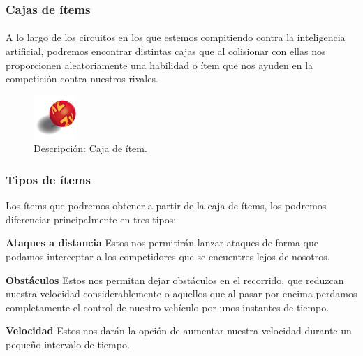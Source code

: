\subsubsection{Cajas de ítems} 

\paragraph{}
A lo largo de los circuitos en los que estemos compitiendo contra la inteligencia artificial, 
podremos encontrar distintas cajas que al colisionar con ellas nos proporcionen
aleatoriamente una habilidad o ítem que nos
ayuden en la competición contra nuestros rivales.

\begin{figure}[H]
	\label{item_box}
	\begin{center}
		\includegraphics[scale=1]{imagenes/items/item_box.png}
	\end{center}
	\caption{Descripción: Caja de ítem.}
\end{figure}

\subsubsection{Tipos de ítems}

Los ítems que podremos obtener a partir de la caja de ítems, los podremos diferenciar principalmente en tres tipos:

\begin{description}
	\item \textbf{Ataques a distancia} Estos nos permitirán lanzar ataques
        de forma que podamos interceptar a los competidores que 
	se encuentres lejos de nosotros.
	
	\item \textbf{Obstáculos} Estos nos permitan dejar obstáculos en el
        recorrido, que reduzcan nuestra velocidad considerablemente
	o aquellos que al pasar por encima perdamos completamente el control de nuestro vehículo por unos instantes de tiempo.
	
	\item \textbf{Velocidad} Estos nos darán la opción de aumentar nuestra velocidad durante un pequeño intervalo de tiempo.
\end{description}
